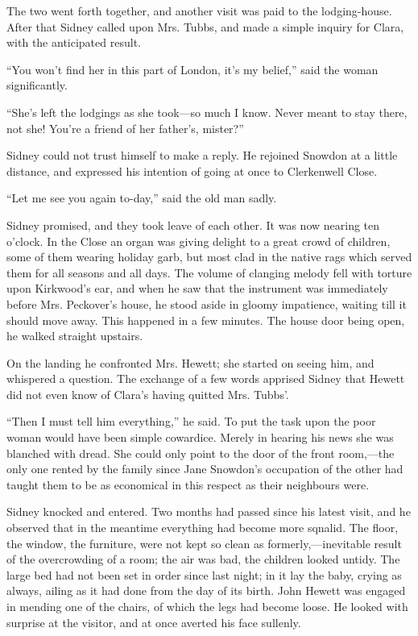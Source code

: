The two went forth together, and another visit was paid to the
lodging-house. After that Sidney called upon Mrs. Tubbs, and made a
simple inquiry for Clara, with the anticipated result.

``You won't find her in this part of London, it's my belief,'' said the
woman significantly.

``She's left the lodgings as she took---so much I know. Never meant to
stay there, not she! You're a friend of her father's, mister?''

Sidney could not trust himself to make a reply. He rejoined Snowdon at a
little distance, and expressed his intention of going at once to
Clerkenwell Close.

``Let me see you again to-day,'' said the old man sadly.

Sidney promised, and they took leave of each other. It was now nearing
ten o'clock. In the Close an organ was giving delight to a great crowd
of children, some of them wearing holiday garb, but most clad in the
native rags which served them for all seasons and all days. {}The volume
of clanging melody fell with torture upon Kirkwood's ear, and when he
saw that the instrument was immediately before Mrs. Peckover's house, he
stood aside in gloomy impatience, waiting till it should move away. This
happened in a few minutes. The house door being open, he walked straight
upstairs.

On the landing he confronted Mrs. Hewett; she started on seeing him, and
whispered a question. The exchange of a few words apprised Sidney that
Hewett did not even know of Clara's having quitted Mrs. Tubbs'.

``Then I must tell him everything,'' he said. To put the task upon the
poor woman would have been simple cowardice. Merely in hearing his news
she was blanched with dread. She could only point to the door of the
front room,---the only one rented by the family since Jane Snowdon's
occupation of the other had taught them to be as economical in this
respect as their neighbours were.

Sidney knocked and entered. Two months had passed since his latest
visit, and he {}observed that in the meantime everything had become more
sqnalid. The floor, the window, the furniture, were not kept so clean as
formerly,---inevitable result of the overcrowding of a room; the air was
bad, the children looked untidy. The large bed had not been set in order
since last night; in it lay the baby, crying as always, ailing as it had
done from the day of its birth. John Hewett was engaged in mending one
of the chairs, of which the legs had become loose. He looked with
surprise at the visitor, and at once averted his face sullenly.

